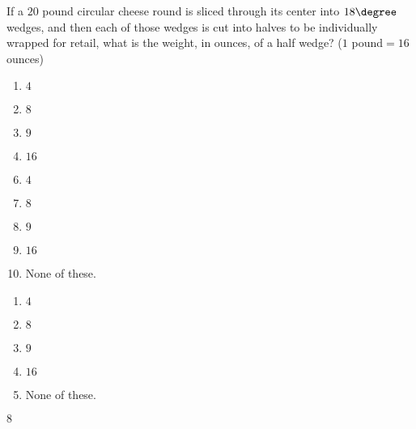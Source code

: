  
If a $20$ pound circular cheese round is sliced through its center into $18\degree$ wedges, and then each of those wedges is cut into halves to be individually wrapped for retail, what is the weight, in ounces, of a half wedge? ($1$ pound$=16$ ounces) 


\ifsat
	\begin{enumerate}[label=\Alph*)]
		\item $4 $ 
		\item $8 $ %
		\item $9 $ 
		\item $16 $
	\end{enumerate}
\else
\fi

\ifacteven
	\begin{enumerate}[label=\textbf{\Alph*.},itemsep=\fill,align=left]
		\setcounter{enumii}{5}
		\item $4 $ 
		\item $8 $ %
		\item $9 $ 
		\addtocounter{enumii}{1}
		\item $16 $
		\item None of these. 
	\end{enumerate}
\else
\fi

\ifactodd
	\begin{enumerate}[label=\textbf{\Alph*.},itemsep=\fill,align=left]
		\item $4 $ 
		\item $8 $ %
		\item $9 $ 
		\item $16 $
		\item None of these. 
	\end{enumerate}
\else
\fi

\ifgridin
 $8 $ %
		
\else
\fi


